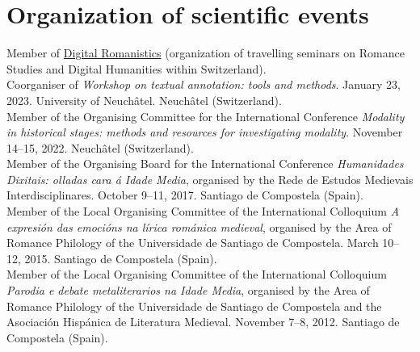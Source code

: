 \documentclass[11pt, a4paper]{article}
\newcommand{\years}[1]{\marginnote{\scriptsize #1}}
\begin{document}
\section{Organization of scientific events}
\years{2022--}Member of \href{https://digitalromanistics.github.io/}{Digital Romanistics} (organization of travelling seminars on Romance Studies and Digital Humanities within Switzerland).\\
\years{2023}Coorganiser of \textit{Workshop on textual annotation: tools and methods}. January 23, 2023. University of Neuchâtel. Neuchâtel (Switzerland).\\
\years{2022}Member of the Organising Committee for the International Conference \textit{Modality in historical stages: methods and resources for investigating modality}. November 14--15, 2022. Neuchâtel (Switzerland).\\
\years{2017}Member of the Organising Board for the International Conference \textit{Humanidades Dixitais: olladas cara á Idade Media}, organised by the Rede de Estudos Medievais Interdisciplinares. October 9--11, 2017. Santiago de Compostela (Spain).\\
\years{2015}Member of the Local Organising Committee of the International Colloquium \textit{A expresión das emocións na lírica románica medieval}, organised by the Area of Romance Philology of the Universidade de Santiago de Compostela. March 10--12, 2015. Santiago de Compostela (Spain). \\
\years{2012}Member of the Local Organising Committee of the International Colloquium \textit{Parodia e debate metaliterarios na Idade Media}, organised by the Area of Romance Philology of the Universidade de Santiago de Compostela and the Asociación Hispánica de Literatura Medieval. November 7--8, 2012. Santiago de Compostela (Spain).
\end{document}
